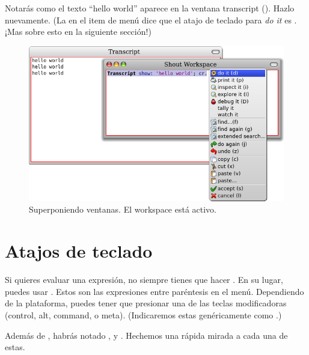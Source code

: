 \documentclass[a4paper,10pt,twoside]{book}
\begin{document}
Notar\'as como el texto ``hello world'' aparece en la ventana transcript
().
Hazlo nuevamente.
(La  en el item de men\'u  dice que el atajo de teclado para \emph{do it} es . ¡Mas sobre esto en la siguiente secci\'on!)

\begin{figure}[htb]
\centerline {\includegraphics[width=\textwidth]{HelloWorld}}
\caption{Superponiendo ventanas. El workspace est\'a activo.}
\end{figure}

\section{Atajos de teclado}

Si quieres evaluar una expresi\'on, no siempre tienes que hacer \actclick. En su lugar, puedes usar . Estos son las expresiones entre par\'entesis en el men\'u. Dependiendo de la plataforma, puedes tener que presionar una de las teclas modificadoras (control, alt, command, o meta).
(Indicaremos estas gen\'ericamente como .)


Adem\'as de , habr\'as notado ,  y . Hechemos una r\'apida mirada a cada una de estas.

\end{document}
